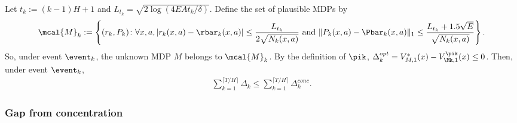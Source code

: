 Let $t_k:=(k-1)H+1$ and $L_{t_k}=\sqrt{2\log(4EAt_k/\delta)}$.
Define the set of plausible MDPs by
\begin{align*}
\mcal{M}_k :=\left\{(r_k,P_k) \colon \forall x,a, \vert r_k(x,a)-\rbar_k(x,a)\vert \le \frac{L_{t_k}}{2\sqrt{N_k(x,a)}} \text{ and } \Vert P_k(x,a)-\Pbar_k(x,a)\Vert_1\le \frac{L_{t_k}+1.5\sqrt{E}}{\sqrt{N_k(x,a)}}\right\}.
\end{align*}
So, under event $\event_k$, the unknown MDP $M$ belongs to $\mcal{M}_k$.
By the definition of $\pik$, $\Delta_k^{opt}=V^*_{M,1}(x) -V^{\pik}_{\Mk,1}(x)\le0$.
Then, under event $\event_k$,
\begin{align*}
\sum_{k=1}^{\lceil T/H\rceil}\Delta_k \le \sum_{k=1}^{\lceil T/H\rceil}\Delta_k^{conc}.
\end{align*}

\subsubsection{Gap from concentration}
\label{subsubsec:sec_gap_conc}

